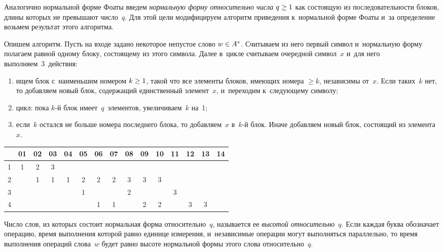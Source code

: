 \begin{multicols}{2}
   Аналогично нормальной форме Фоаты введем \textit{нормальную форму 
относительно числа} $q\hm\geq 1$ как состоящую из последовательности 
блоков, длины которых не превышают число~$q$. Для этой цели 
модифицируем алгоритм приведения к~нормальной форме Фоаты и~за 
определение возьмем результат этого алгоритма.
   
   Опишем алгоритм. Пусть на входе задано некоторое непустое слово 
$w\hm\in A^*$. Считываем из него первый символ и~нормальную форму 
полагаем равной одному блоку, состоящему из этого символа. Далее 
в~цикле считываем очередной символ~$x$  и~для него 
выполняем~3~действия:
   \begin{enumerate}[(1)]
\item ищем блок с~наименьшим номером $k\hm\geq1$, такой что все 
элементы блоков, имеющих номера $\geq k$, независимы от~$x$. Если 
таких~$k$ нет, то добавляем новый блок, содержащий единственный 
элемент~$x$, и~переходим к~следующему символу;
\item цикл: пока $k$-й блок имеет~$q$~элементов, увеличиваем~$k$ 
на~1;
\item если~$k$ остался не больше номера последнего блока, то 
добавляем~$x$ в~$k$-й блок. Иначе до\-бав\-ля\-ем новый блок, состоящий из 
элемента~$x$. 
  \end{enumerate}
  
    \setcounter{table}{1}
    \begin{table*}[b]\small %
  \begin{center}
  \vspace*{2ex}
  
  \begin{tabular}{|c|c|c|c|c|c|c|c|c|c|c|c|c|c|c|}
  \hline
&01 &02&03&04&05&06&07&08&09&10&11&12&13&14\\
\hline
1&1&2&3&&&&&&&&&&&\\
2&&1&1&1&2&2&2&3&3&3&&&&\\
3&&&&&1&&&2&&&3&&&\\
4&&&&&&1&1&&2&2&&3&3&\\
\hline
\end{tabular}
\end{center}
\end{table*}
     
  
  Число слов, из которых состоит нормальная форма относительно~$q$, 
называется ее \textit{высотой относительно}~$q$. Если каждая буква 
обозначает операцию, время выполнения которой равно единице измерения, 
и~независимые операции могут выполняться параллельно, то время 
выполнения операций слова~$w$ будет равно высоте нормальной формы 
этого слова относительно~$q$. 
  

\end{multicols}
